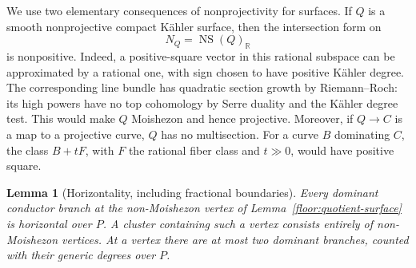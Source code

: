 \documentclass[11pt,letterpaper]{article}
\newtheorem{lemma}[theorem]{Lemma}
\theoremstyle{definition}
\theoremstyle{remark}
\begin{document}
We use two elementary consequences of nonprojectivity for surfaces.
If $Q$ is a smooth nonprojective compact K\"ahler surface, then the
intersection form on
\[
 N_Q=\operatorname{NS}(Q)_{\mathbb{R}}
\]
is nonpositive.  Indeed, a positive-square vector in this rational
subspace can be approximated by a rational one, with sign chosen to
have positive K\"ahler degree.  The corresponding line bundle has
quadratic section growth by Riemann--Roch: its high powers have no
top cohomology by Serre duality and the K\"ahler degree test.  This
would make $Q$ Moishezon and hence projective.  Moreover, if
$Q\to C$ is a map to a projective curve, $Q$ has no multisection.
For a curve $B$ dominating $C$, the class $B+tF$, with $F$ the
rational fiber class and $t\gg0$, would have positive square.

\begin{lemma}[Horizontality, including fractional boundaries]
\label{floor:horizontality}
Every dominant conductor branch at the non-Moishezon vertex of
Lemma~\ref{floor:quotient-surface} is horizontal over $P$.  A
cluster containing such a vertex consists entirely of
non-Moishezon vertices.  At a vertex there are at most two dominant
branches, counted with their generic degrees over $P$.
\end{lemma}
\end{document}
